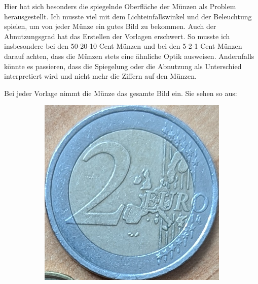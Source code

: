 Hier hat sich besonders die spiegelnde Oberfläche der Münzen als Problem herausgestellt. Ich musste viel mit dem Lichteinfallswinkel und der Beleuchtung spielen, um von jeder Münze ein gutes Bild zu bekommen. Auch der Abnutzungsgrad hat das Erstellen der Vorlagen erschwert. So musste ich insbesondere bei den 50-20-10 Cent Münzen und bei den 5-2-1 Cent Münzen darauf achten, dass die Münzen stets eine ähnliche Optik ausweisen. Andernfalls könnte es passieren, dass die Spiegelung oder die Abnutzung als Unterschied interpretiert wird und nicht mehr die Ziffern auf den Münzen.

Bei jeder Vorlage nimmt die Münze das gesamte Bild ein. Sie sehen so aus:

\begin{figure}[ht]
    \centering
    \begin{subfigure}{0.23\textwidth}
        \includegraphics[width=\linewidth]{../CoinFinder/templates_2/Euro2.png}
    \end{subfigure}
    \begin{subfigure}{0.23\textwidth}

\end{subfigure}
\end{figure}
